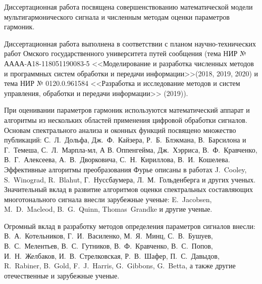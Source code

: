 Диссертационная работа посвящена совершенствованию математической модели мультигармонического сигнала и численным методам оценки параметров гармоник. 

Диссертационная работа выполнена в соответствии с планом научно-технических работ Омского государственного университета путей сообщения (тема НИР № АААА-А18-118051190083-5 <<Моделирование и разработка численных методов и программных систем обработки и
передачи информации>>(2018, 2019, 2020) и тема НИР № 0120.0.961584 <<Разработка и исследование методов и систем управления,
обработки и передачи информации>> (2019)).

{\progress}
При оценивании параметров гармоник используются математический аппарат и алгоритмы из нескольких областей применения цифровой обработки сигналов.
Основам спектрального анализа и оконных функций посвящено множество публикаций: С.~Л.~Дольфа, Дж.~Ф.~Кайзера, Р.~Б.~Блэкмана, В.~Барсилона и Г.~Темеша, С.~Л.~Марпла-мл, А В. Оппенгейма, Дж.~Хэрриса, В.~Ф.~Кравченко, В.~Г.~Алексеева, А.~В.~Дворковича, С.~Н.~Кириллова, В.~И.~Кошелева. Эффективные алгоритмы преобразования Фурье описаны в работах J.~Cooley, S.~Winograd, R.~Blahut, Г.~Нуссбаумера, Л.~М.~Гольденберга и других ученых.
Значительный вклад в развитие алгоритмов оценки спектральных составляющих многотонального сигнала внесли зарубежные ученые:
E.~Jacobsen, M.~D.~Macleod, B.~G.~Quinn, Thomas~Grandke и другие ученые.

Огромный вклад в разработку методов определения параметров сигналов внесли: В.~А.~Котельников,  Г.~И.~Василенко,  М.~Я.~Минц, С.~В.~Бушуев, В.~С.~Мелентьев, В.~С.~Гутников,  В.~Ф.~Кравченко, В.~С.~Попов, И.~Н.~Желбаков, И.~В.~Стрелковская, Р.~В.~Шафер, П.~С.~Давыдов,  R.~Rabiner, B.~Gold, F.~J.~Harris, G.~Gibbons, G.~Betta, а также другие отечественные и зарубежные ученые.

